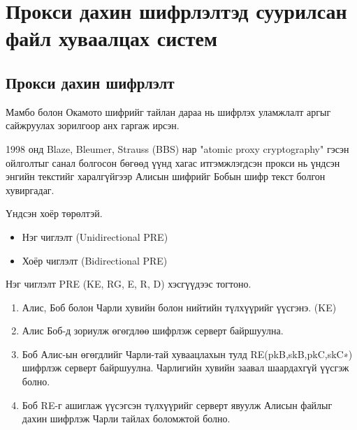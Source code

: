 
\chapter{Прокси дахин шифрлэлтэд суурилсан файл хуваалцах систем} %
\label{Chapter2} %
\pagecolor{white}

\section{Прокси дахин шифрлэлт}
Мамбо болон Окамото шифрийг тайлан дараа нь шифрлэх уламжлалт аргыг сайжруулах зорилгоор анх гаргаж ирсэн.

1998 онд Blaze, Bleumer, Strauss (BBS) нар "atomic proxy cryptography" гэсэн ойлголтыг санал болгосон бөгөөд үүнд хагас итгэмжлэгдсэн прокси нь үндсэн энгийн текстийг харалгүйгээр Алисын шифрийг Бобын шифр текст болгон хувиргадаг.

Үндсэн хоёр төрөлтэй.
\begin{itemize}
    \item Нэг чиглэлт (Unidirectional PRE)
    \item Хоёр чиглэлт (Bidirectional PRE)
\end{itemize}

Нэг чиглэлт PRE (KE, RG, E, R, D) хэсгүүдээс тогтоно.

\begin{enumerate}
    \item Алис, Боб болон Чарли хувийн болон нийтийн түлхүүрийг үүсгэнэ. (KE)
    \item Алис Боб-д зориулж өгөгдлөө шифрлэж серверт байршуулна.
    \item Боб Алис-ын өгөгдлийг Чарли-тай хуваацлахын тулд RE(pkB,skB,pkC,skC∗) шифрлэж серверт байршуулна. Чарлигийн хувийн заавал шаардахгүй үүсгэж болно.
    \item Боб RE-г ашиглаж үүсэгсэн түлхүүрийг серверт явуулж Алисын файлыг дахин шифрлэж Чарли тайлах боломжтой болно.
\end{enumerate}

